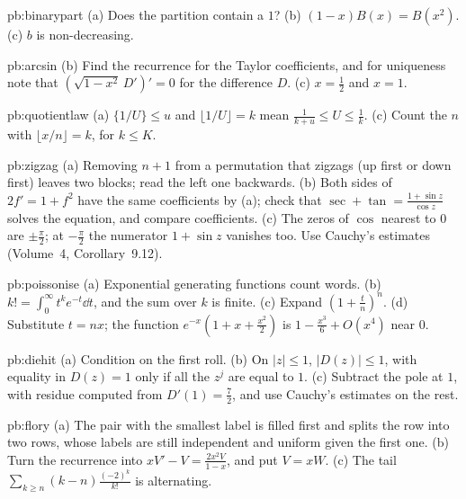 \begin{hint}{pb:binarypart}
(a) Does the partition contain a $1$? (b) $(1-x)B(x)=B(x^2)$. (c) $b$ is non-decreasing.
\end{hint}

\begin{hint}{pb:arcsin}
(b) Find the recurrence for the Taylor coefficients, and for uniqueness note that $(\sqrt{1-x^2}\,D')'=0$ for the difference $D$.
(c) $x=\frac12$ and $x=1$.
\end{hint}

\begin{hint}{pb:quotientlaw}
(a) $\{1/U\}\le u$ and $\lfloor 1/U\rfloor=k$ mean $\frac1{k+u}\le U\le\frac1k$. (c) Count the $n$ with $\lfloor x/n\rfloor=k$, for $k\le K$.
\end{hint}

\begin{hint}{pb:zigzag}
(a) Removing $n+1$ from a permutation that zigzags (up first or down first) leaves two blocks; read the left one backwards. (b) Both sides of $2f'=1+f^2$ have the
same coefficients by (a); check that $\sec+\tan=\frac{1+\sin z}{\cos z}$ solves the equation, and compare coefficients. (c) The zeros of $\cos$ nearest to $0$ are $\pm\frac\pi2$; at
$-\frac\pi2$ the numerator $1+\sin z$ vanishes too. Use Cauchy's estimates (Volume~4, Corollary~9.12).
\end{hint}

\begin{hint}{pb:poissonise}
(a) Exponential generating functions count words. (b) $k!=\int_0^\infty t^ke^{-t}\dd t$, and the sum over $k$ is finite. (c) Expand $(1+\frac tn)^n$. (d) Substitute $t=nx$; the
function $e^{-x}(1+x+\frac{x^2}2)$ is $1-\frac{x^3}6+O(x^4)$ near $0$.
\end{hint}

\begin{hint}{pb:diehit}
(a) Condition on the first roll. (b) On $|z|\le1$, $|D(z)|\le1$, with equality in $D(z)=1$ only if all the $z^j$ are equal to $1$. (c) Subtract the pole at $1$, with residue computed from $D'(1)=\frac72$,
and use Cauchy's estimates on the rest.
\end{hint}

\begin{hint}{pb:flory}
(a) The pair with the smallest label is filled first and splits the row into two rows, whose labels are still independent and uniform given the first one. (b) Turn the
recurrence into $xV'-V=\frac{2x^2V}{1-x}$, and put $V=xW$. (c) The tail $\sum_{k\ge n}(k-n)\frac{(-2)^k}{k!}$ is alternating.
\end{hint}

